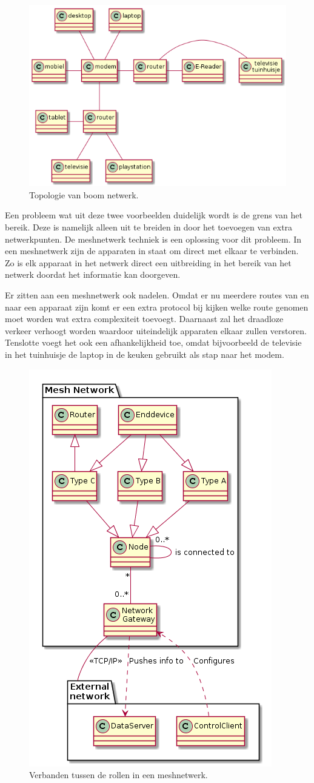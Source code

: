 \documentclass[a4paper, 11pt, oneside]{report}
\begin{document}
\begin{figure}[H]
	\begin{center}\includegraphics[width=.5\linewidth]{treeTopo}\end{center}
	\caption{Topologie van boom netwerk.}
	\label{fig:toplogieboom}
\end{figure}

Een probleem wat uit deze twee voorbeelden duidelijk wordt is de grens van het bereik. 
Deze is namelijk alleen uit te breiden in door het toevoegen van extra netwerkpunten.
De meshnetwerk techniek is een oplossing voor dit probleem.
In een meshnetwerk zijn de apparaten in staat om direct met elkaar te verbinden. 
Zo is elk apparaat in het netwerk direct een uitbreiding in het bereik van het netwerk doordat het informatie kan doorgeven.

Er zitten aan een meshnetwerk ook nadelen.
Omdat er nu meerdere routes van en naar een apparaat zijn komt er een extra protocol bij kijken welke route genomen moet worden wat extra complexiteit toevoegt.
Daarnaast zal het draadloze verkeer verhoogt worden waardoor uiteindelijk apparaten elkaar zullen verstoren.
Tenslotte voegt het ook een afhankelijkheid toe, omdat bijvoorbeeld de televisie in het tuinhuisje de laptop in de keuken gebruikt als stap naar het modem.

\begin{figure}[H]
	\begin{center}\includegraphics[width=.3\linewidth]{meshclass}\end{center}
	\caption{Verbanden tussen de rollen in een meshnetwerk.}
	\label{fig:meshrol}
\end{figure}
\end{document}
